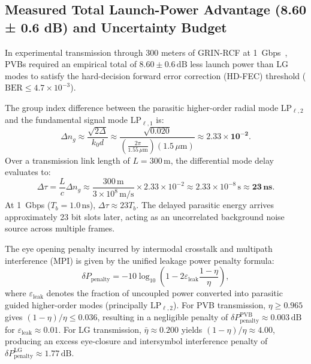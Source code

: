 \documentclass{optica-article}
\begin{document}
\subsection{Measured Total Launch-Power Advantage (8.60 ± 0.6 dB) and Uncertainty Budget}
\label{sec:rcf_empirical_860db}

In experimental transmission through 300 meters of GRIN-RCF at 1~Gbps~\cite{Villalba2023}, PVBs required an empirical total of $8.60 \pm 0.6\,\text{dB}$ less launch power than LG modes to satisfy the hard-decision forward error correction (HD-FEC) threshold ($\text{BER} \le 4.7 \times 10^{-3}$).

The group index difference between the parasitic higher-order radial mode LP$_{\ell, 2}$ and the fundamental signal mode LP$_{\ell, 1}$ is:
\begin{equation}
\Delta n_g \approx \frac{\sqrt{2\Delta}}{k_0 d} \approx \frac{\sqrt{0.020}}{\left( \frac{2\pi}{1.55\,\mu\text{m}} \right) (1.5\,\mu\text{m})} \approx \mathbf{2.33 \times 10^{-2}}.
\label{eq:dmd_delta_ng}
\end{equation}
Over a transmission link length of $L = 300\,\text{m}$, the differential mode delay evaluates to:
\begin{equation}
\Delta \tau = \frac{L}{c} \Delta n_g \approx \frac{300\,\text{m}}{3 \times 10^8\,\text{m/s}} \times 2.33 \times 10^{-2} \approx 2.33 \times 10^{-8}\,\text{s} \approx \mathbf{23\,\text{ns}}.
\label{eq:dmd_calculation}
\end{equation}
At 1~Gbps ($T_b = 1.0\,\text{ns}$), $\Delta \tau \approx 23 T_b$. The delayed parasitic energy arrives approximately 23 bit slots later, acting as an uncorrelated background noise source across multiple frames.

The eye opening penalty incurred by intermodal crosstalk and multipath interference (MPI) is given by the unified leakage power penalty formula:
\begin{equation}
\delta P_{\text{penalty}} = -10 \log_{10}\left( 1 - 2 \varepsilon_{\text{leak}} \frac{1 - \eta}{\eta} \right),
\label{eq:isi_penalty_formula}
\end{equation}
where $\varepsilon_{\text{leak}}$ denotes the fraction of uncoupled power converted into parasitic guided higher-order modes (principally $\text{LP}_{\ell, 2}$). For PVB transmission, $\eta \ge 0.965$ gives $(1-\eta)/\eta \le 0.036$, resulting in a negligible penalty of $\delta P_{\text{penalty}}^{\text{PVB}} \approx 0.003\,\text{dB}$ for $\varepsilon_{\text{leak}} \approx 0.01$. For LG transmission, $\bar{\eta} \approx 0.200$ yields $(1-\eta)/\eta \approx 4.00$, producing an excess eye-closure and intersymbol interference penalty of $\delta P_{\text{penalty}}^{\text{LG}} \approx 1.77\,\text{dB}$.
\end{document}
